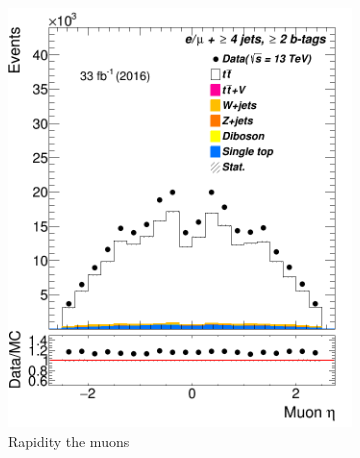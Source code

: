 \begin{figure}
\begin{subfigure}{0.25\textwidth}
		\includegraphics[width=\linewidth]{ControlPlots_emujets_2016_4incl_2incl/mu_eta_emujets_2016.png}
		\caption{Rapidity the muons} \label{fig:c2}
	\end{subfigure}\hspace*{1.0cm}
	\begin{subfigure}{0.25\textwidth}

\end{subfigure}
\end{figure}
